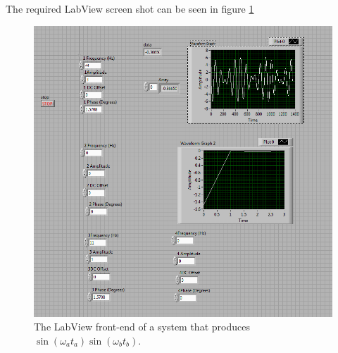 \documentclass{article}
\theoremstyle{plain}
\theoremstyle{definition}
\theoremstyle{remark}
\begin{document}
The required LabView screen shot can be seen in figure \ref{q2_h}

\begin{figure}[h]
\begin{center}
\includegraphics[width=15cm]{problem2_h.png}
\end{center}
\caption{The LabView front-end of a system that produces $\sin(\omega_a t_a)\sin(\omega_b t_b) $.}
\label{q2_h}
\end{figure}
\end{document}
